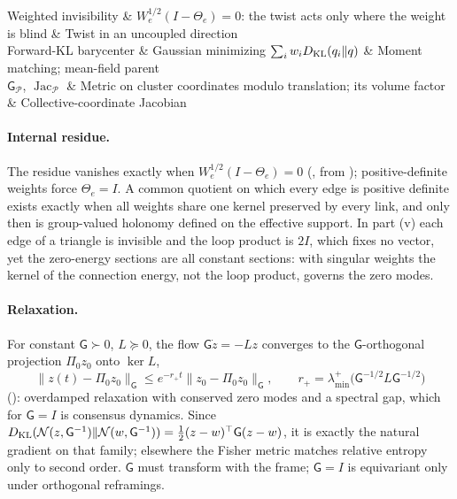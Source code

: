\begin{decoder}
Weighted invisibility & \(W_e^{1/2}(I-\Theta_e)=0\): the twist acts only where the weight is blind & Twist in an uncoupled direction\\
Forward-KL barycenter & Gaussian minimizing \(\sum_iw_iD_{\mathrm{KL}}(q_i\Vert q)\) & Moment matching; mean-field parent\\
\(\mathsf G_{\mathcal P}\), \(\operatorname{Jac}_{\mathcal P}\) & Metric on cluster coordinates modulo translation; its volume factor & Collective-coordinate Jacobian\\
\end{decoder}

\paragraph{Internal residue.} The residue vanishes exactly when \(W_e^{1/2}(I-\Theta_e)=0\)
(, from ); positive-definite weights force \(\Theta_e=I\). A
common quotient on which every edge is positive definite exists exactly when all weights share one kernel preserved
by every link, and only then is group-valued holonomy defined on the effective support. In part (v) each edge of a
triangle is invisible and the loop product is \(2I\), which fixes no vector, yet the zero-energy sections are all
constant sections: with singular weights the kernel of the connection energy, not the loop product, governs the
zero modes.

\paragraph{Relaxation.} For constant \(\mathsf G\succ0\), \(L\succeq0\), the flow \(\mathsf G\dot z=-Lz\) converges to the
\(\mathsf G\)-orthogonal projection \(\Pi_0z_0\) onto \(\ker L\),
\[
\lVert z(t)-\Pi_0z_0\rVert_{\mathsf G}\leq e^{-r_+t}\lVert z_0-\Pi_0z_0\rVert_{\mathsf G},\qquad
r_+=\lambda_{\min}^+\bigl(\mathsf G^{-1/2}L\mathsf G^{-1/2}\bigr)
\]
(): overdamped relaxation with conserved zero modes and a spectral gap, which
for \(\mathsf G=I\) is consensus dynamics. Since \(D_{\mathrm{KL}}(\mathcal N(z,\mathsf G^{-1})\Vert\mathcal N(w,\mathsf G^{-1}))
=\tfrac12(z-w)^\top\mathsf G(z-w)\), it is exactly the natural gradient on that family; elsewhere the Fisher metric
matches relative entropy only to second order. \(\mathsf G\) must transform with the frame; \(\mathsf G=I\) is
equivariant only under orthogonal reframings.

